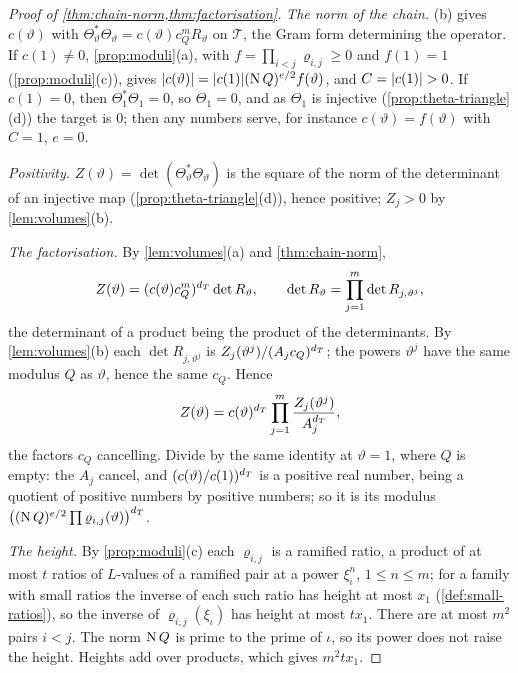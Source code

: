 \begin{proof}[Proof of \cref{thm:chain-norm,thm:factorisation}]
\emph{The norm of the chain.} (b) gives $c(\vartheta)$ with $\Theta_\vartheta^*\Theta_\vartheta=c(\vartheta)c_Q^mR_\vartheta$ on $\mathcal T$, the Gram form determining the operator. If $c(1)\ne0$, \cref{prop:moduli}(a), with
$f=\prod_{i<j}\varrho_{i,j}\ge0$ and $f(1)=1$ (\cref{prop:moduli}(c)), gives $\lvert c(\vartheta)\rvert=\lvert c(1)\rvert(\operatorname{N} Q)^{e/2}f(\vartheta)$, and $C=\lvert c(1)\rvert>0$. If $c(1)=0$, then $\Theta_1^*\Theta_1=0$, so $\Theta_1=0$, and as
$\Theta_1$ is injective (\cref{prop:theta-triangle}(d)) the target is $0$; then any numbers serve, for instance $c(\vartheta)=f(\vartheta)$ with $C=1$, $e=0$.

\emph{Positivity.} $Z(\vartheta)=\det(\Theta_\vartheta^*\Theta_\vartheta)$ is the square of the norm of the determinant of an injective map (\cref{prop:theta-triangle}(d)), hence positive; $Z_j>0$ by \cref{lem:volumes}(b).

\emph{The factorisation.} By \cref{lem:volumes}(a) and \cref{thm:chain-norm},
\[
  Z(\vartheta)=(c(\vartheta)c_Q^m)^{d_T}\det R_\vartheta,\qquad\det R_\vartheta=\prod_{j=1}^m\det R_{j,\vartheta^j},
\]
the determinant of a product being the product of the determinants. By \cref{lem:volumes}(b) each $\det R_{j,\vartheta^j}$ is $Z_j(\vartheta^j)/(A_jc_Q)^{d_T}$; the powers $\vartheta^j$ have the same modulus $Q$ as $\vartheta$, hence the same $c_Q$. Hence
\[
  Z(\vartheta)=c(\vartheta)^{d_T}\prod_{j=1}^m\frac{Z_j(\vartheta^j)}{A_j^{d_T}},
\]
the factors $c_Q$ cancelling. Divide by the same identity at $\vartheta=1$, where $Q$ is empty: the $A_j$ cancel, and $(c(\vartheta)/c(1))^{d_T}$ is a positive real number, being a quotient of positive numbers by
positive numbers; so it is its modulus $\bigl((\operatorname{N} Q)^{e/2}\prod\varrho_{i,j}(\vartheta)\bigr)^{d_T}$.

\emph{The height.} By \cref{prop:moduli}(c) each $\varrho_{i,j}$ is a ramified ratio, a product of at most $t$ ratios of $L$-values of a ramified pair at a power $\xi_\iota^n$, $1\le n\le m$; for a family with small ratios
the inverse of each such ratio has height at most $x_1$ (\cref{def:small-ratios}), so the inverse of $\varrho_{i,j}(\xi_\iota)$ has height at most $tx_1$. There are at most $m^2$ pairs $i<j$. The norm $\operatorname{N} Q$ is prime to the
prime of $\iota$, so its power does not raise the height. Heights add over products, which gives $m^2tx_1$.
\end{proof}

